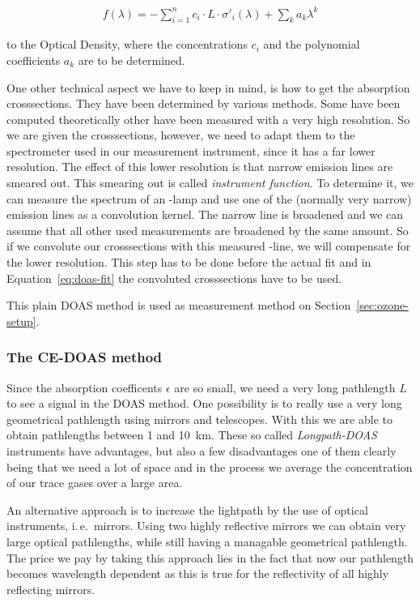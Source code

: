 \begin{align}
  f(\lambda) = - \sum_{i=1}^n c_i \cdot L \cdot \sigma'_i(\lambda) +
  \sum_k a_k \lambda^k \label{eq:doas-fit}
\end{align}

to the Optical Density, where the concentrations $c_i$ and the polynomial
coefficients $a_k$ are to be determined. 

One other technical aspect we have to keep in mind, is how to get the
absorption crosssections. They have been determined by various
methods. Some have been computed theoretically other have been
measured with a very high resolution. So we are given the
crosssections, however, we need to adapt them to the spectrometer used
in our measurement instrument, since it has a far lower
resolution. The effect of this lower resolution is that narrow
emission lines are smeared out. This smearing out is called
\emph{instrument function}. To determine it, we can measure the
spectrum of an -lamp and use one of the
(normally very narrow) emission lines as a convolution kernel. The
narrow line is broadened and we can assume that all other used
measurements are broadened by the same amount. So if we convolute our
crosssections with this measured -line, we will compensate for
the lower resolution. This step has to be done before the actual fit
and in Equation~\eqref{eq:doas-fit} the convoluted crosssections have
to be used.

This plain DOAS method is used as measurement method on
Section~\ref{sec:ozone-setup}. 

\subsubsection{The CE-DOAS method}
\label{sec:ce-doas}

Since the absorption coefficents $\epsilon$ are so small, we need a
very long pathlength $L$ to see a signal in the DOAS method. One
possibility is to really use a very long geometrical pathlength using
mirrors and telescopes. With this we are able to obtain pathlengths
between \num{1} and \SI{10}{\kilo\meter}. These so called
\emph{Longpath-DOAS} instruments have advantages, but also a few
disadvantages one of them clearly being that we need a lot of space
and in the process we average the concentration of our trace gases
over a large area.

An alternative approach is to increase the lightpath by the use of
optical instruments, i.\,e.\ mirrors. Using two highly reflective
mirrors we can obtain very large optical pathlengths, while still
having a managable geometrical pathlength. The price we pay by taking
this approach lies in the fact that now our pathlength becomes
wavelength dependent as this is true for the reflectivity of all
highly reflecting mirrors. 

